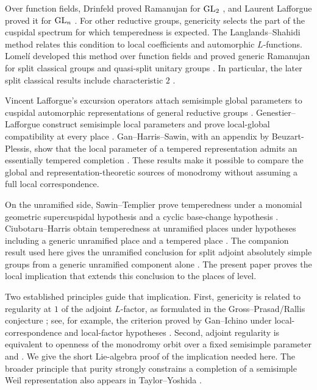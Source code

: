 Over function fields, Drinfeld proved Ramanujan for $\mathrm{GL}_2$
\cite{Dri88}, and Laurent Lafforgue proved it for $\mathrm{GL}_n$
\cite[Th\'eor\`eme~VI.10(i)]{Laf02}. For other reductive groups,
genericity selects the part of the cuspidal spectrum for which
temperedness is expected. The Langlands--Shahidi method relates this
condition to local coefficients and automorphic $L$-functions.
Lomel\'i developed this method over function fields and proved
generic Ramanujan for split classical groups and quasi-split unitary
groups \cite{Lom09,LomeliLS,Lom19}. In particular, the later split
classical results include characteristic $2$
\cite[Theorem~7.1(i)]{Lom19}.

Vincent Lafforgue's excursion operators attach semisimple global
parameters to cuspidal automorphic representations of general
reductive groups \cite{VLafforgue}. Genestier--Lafforgue construct
semisimple local parameters and prove local-global compatibility
at every place \cite{GenestierLafforgue}. Gan--Harris--Sawin, with
an appendix by Beuzart-Plessis, show that the local parameter of a
tempered representation admits an essentially tempered completion
\cite[Theorem~1.2 and Corollary~1.3]{GHS}. These results make it
possible to compare the global and representation-theoretic sources
of monodromy without assuming a full local correspondence.

On the unramified side, Sawin--Templier prove temperedness under a
monomial geometric supercuspidal hypothesis and a cyclic base-change
hypothesis \cite{SawinTemplier2021}. Ciubotaru--Harris obtain temperedness at
unramified places under hypotheses including a generic unramified
place and a tempered place \cite{CH26}. The companion result used
here gives the unramified conclusion for split adjoint absolutely
simple groups from a generic unramified component alone
\cite[Corollary~1.2]{UnramifiedRamanujan}. The present paper proves
the local implication that extends this conclusion to the places
of level.

Two established principles guide that implication. First, genericity
is related to regularity at $1$ of the adjoint $L$-factor, as formulated
in the Gross--Prasad/Rallis conjecture
\cite[Conjecture~2.6]{GrossPrasad1992}; see, for
example, the criterion proved by Gan--Ichino under local-correspondence
and local-factor hypotheses \cite[Appendix~B, Proposition~B.1]{GanIchino2016}.
Second, adjoint regularity is equivalent to openness of the
monodromy orbit over a fixed semisimple parameter
\cite[Proposition~3.5]{CDFZ2025} and \cite[Proposition~6.10]{DHKM2026}.
We give the short Lie-algebra proof of the implication needed here.
The broader principle that purity strongly constrains a completion
of a semisimple Weil representation also appears in
Taylor--Yoshida \cite[Section~1]{TaylorYoshida2007}.


